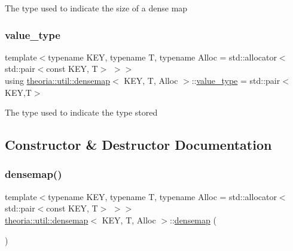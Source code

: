 The type used to indicate the size of a dense map \mbox{\label{classtheoria_1_1util_1_1densemap_a6d2419665695def56b2abbd849f74b08}} 
\subsubsection{\texorpdfstring{value\+\_\+type}{value\_type}}
{\footnotesize\ttfamily template$<$typename K\+EY, typename T, typename Alloc = std\+::allocator$<$std\+::pair$<$const K\+E\+Y, T$>$ $>$$>$ \\
using \hyperlink{classtheoria_1_1util_1_1densemap}{theoria\+::util\+::densemap}$<$ K\+EY, T, Alloc $>$\+::\hyperlink{classtheoria_1_1util_1_1densemap_a6d2419665695def56b2abbd849f74b08}{value\+\_\+type} =  std\+::pair$<$K\+EY,T$>$}

The type used to indicate the type stored 

\subsection{Constructor \& Destructor Documentation}
\mbox{\label{classtheoria_1_1util_1_1densemap_a16acc8f341deb3ac951997def52d6bc5}} 
\subsubsection{\texorpdfstring{densemap()}{densemap()}\hspace{0.1cm}{\footnotesize\ttfamily [1/7]}}
{\footnotesize\ttfamily template$<$typename K\+EY, typename T, typename Alloc = std\+::allocator$<$std\+::pair$<$const K\+E\+Y, T$>$ $>$$>$ \\
\hyperlink{classtheoria_1_1util_1_1densemap}{theoria\+::util\+::densemap}$<$ K\+EY, T, Alloc $>$\+::\hyperlink{classtheoria_1_1util_1_1densemap}{densemap} (\begin{DoxyParamCaption}{ }\end{DoxyParamCaption})\hspace{0.3cm}{\ttfamily [inline]}}

